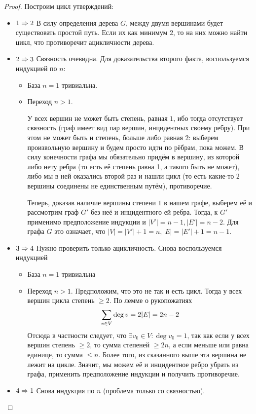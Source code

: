 \begin{proof}
	Построим цикл утверждений:
	\begin{itemize}
		\item $1 \Rightarrow 2$ В силу определения дерева $G$, между двумя вершинами будет существовать простой путь. Если их как минимум 2, то на них можно найти цикл, что противоречит ацикличности дерева.
		
		\item $2 \Rightarrow 3$ Связность очевидна. Для доказательства второго факта, воспользуемся индукцией по $n$:
		\begin{itemize}
			\item База $n = 1$ тривиальна.
			
			\item Переход $n > 1$.
			
			У всех вершин не может быть степень, равная $1$, ибо тогда отсутствует связность (граф имеет вид пар вершин, инцидентных своему ребру). При этом не может быть и степень, больше либо равная $2$: выберем произвольную вершину и будем просто идти по рёбрам, пока можем. В силу конечности графа мы обязательно придём в вершину, из которой либо нету ребра (то есть её степень равна 1, а такого быть не может), либо мы в ней оказались второй раз и нашли цикл (то есть какие-то 2 вершины соединены не единственным путём), противоречие.
			
			Теперь, доказав наличие вершины степени $1$ в нашем графе, выберем её и рассмотрим граф $G'$ без неё и инцидентного ей ребра. Тогда, к $G'$ применимо предположение индукции и $|V'| = n - 1, |E'| = n - 2$. Для графа $G$ это означает, что $|V| = |V'| + 1 = n, |E| = |E'| + 1 = n - 1$.
		\end{itemize}
	
		\item $3 \Rightarrow 4$ Нужно проверить только ацикличность. Снова воспользуемся индукцией
		\begin{itemize}
			\item База $n = 1$ тривиальна
			
			\item Переход $n > 1$. Предположим, что это не так и есть цикл. Тогда у всех вершин цикла степень $\ge 2$. По лемме о рукопожатиях
			\[
				\sum\limits_{v \in V} \deg v = 2|E| = 2n - 2
			\]
			Отсюда в частности следует, что $\exists v_0 \in V \colon \deg v_0 = 1$, так как если у всех вершин степень $\ge 2$, то сумма степеней $\ge 2n$, а если меньше или равна единице, то сумма $\le n$. Более того, из сказанного выше эта вершина не лежит на цикле. Значит, мы можем её и инцидентное ребро убрать из графа, применить предположение индукции и получить противоречие.
		\end{itemize}

		\item $4 \Rightarrow 1$ Снова индукция по $n$ (проблема только со связностью).
	\end{itemize}
\end{proof}

